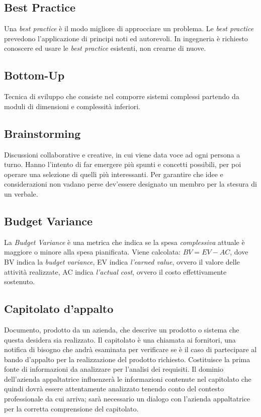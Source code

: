 	
	\subsection{Best Practice}
	\label{sec:bestpractice}
	Una \emph{best practice} è il modo migliore di approcciare un problema. Le \emph{best practice} prevedono l'applicazione di principi noti ed autorevoli. In ingegneria è richiesto conoscere ed usare le \emph{best practice} esistenti, non crearne di nuove.


	\subsection{Bottom-Up}
	\label{sec:bottomup}
	Tecnica di sviluppo che consiste nel comporre sistemi complessi partendo da moduli di dimensioni e complessità inferiori.
	
	
	\subsection{Brainstorming}
	\label{sec:brainstorming}
	Discussioni collaborative e creative, in cui viene data voce ad ogni persona a turno. Hanno l'intento di far emergere più spunti e concetti possibili, per poi operare una selezione di quelli più interessanti. Per garantire che idee e considerazioni non vadano perse dev'essere designato un membro per la stesura di un verbale.

	
	\subsection{Budget Variance}
	\label{sec:budgetvariance}
	La \emph{Budget Variance} è una metrica che indica se la spesa \textit{complessiva} attuale è maggiore o minore alla spesa pianificata. Viene calcolata: $BV = EV - AC$, dove BV indica la \emph{budget variance}, EV indica \emph{l'earned value}, ovvero il valore delle attività realizzate, AC indica \emph{l'actual cost}, ovvero il costo effettivamente sostenuto.
	
	\newpage

	
	\subsection{Capitolato d'appalto}
	\label{sec:capitolato}
	Documento, prodotto da un azienda, che descrive un prodotto o sistema che questa desidera sia realizzato. Il capitolato è una chiamata ai fornitori, una notifica di bisogno che andrà esaminata per verificare se è il caso di partecipare al bando d'appalto per la realizzazione del prodotto richiesto. Costituisce la prima fonte di informazioni da analizzare per l'analisi dei requisiti. Il dominio dell'azienda appaltatrice influenzerà le informazioni contenute nel capitolato che quindi dovrà essere attentamente analizzato tenendo conto del contesto professionale da cui arriva; sarà necessario un dialogo con l'azienda appaltatrice per la corretta comprensione del capitolato.


